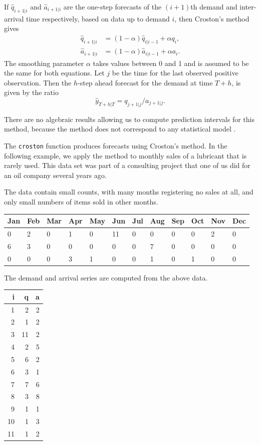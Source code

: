 \documentclass[]{book}
\begin{document}
If \(\hat{q}_{i+1|i}\) and \(\hat{a}_{i+1|i}\) are the one-step forecasts of the \((i+1)\)th demand and inter-arrival time respectively, based on data up to demand \(i\), then Croston's method gives
\begin{align}
\hat{q}_{i+1|i} & = (1-\alpha)\hat{q}_{i|i-1} + \alpha q_i, \label{eq:c2method1}\\
\hat{a}_{i+1|i} & = (1-\alpha)\hat{a}_{i|i-1} + \alpha a_i. \label{eq:c2method2}
\end{align}
The smoothing parameter \(\alpha\) takes values between 0 and 1 and is assumed to be the same for both equations. Let \(j\) be the time for the last observed positive observation. Then the \(h\)-step ahead forecast for the demand at time \(T+h\), is given by the ratio
\begin{equation}\label{c2ratio}
\hat{y}_{T+h|T} = q_{j+1|j}/a_{j+1|j}.
\end{equation}

There are no algebraic results allowing us to compute prediction intervals for this method, because the method does not correspond to any statistical model \citep{SH05}.

The \texttt{croston} function produces forecasts using Croston's method. In the following example, we apply the method to monthly sales of a lubricant that is rarely used. This data set was part of a consulting project that one of us did for an oil company several years ago.

The data contain small counts, with many months registering no sales at all, and only small numbers of items sold in other months.

\begin{tabular}{l|l|l|l|l|l|l|l|l|l|l|l}
\hline
Jan & Feb & Mar & Apr & May & Jun & Jul & Aug & Sep & Oct & Nov & Dec\\
\hline
0 & 2 & 0 & 1 & 0 & 11 & 0 & 0 & 0 & 0 & 2 & 0\\
\hline
6 & 3 & 0 & 0 & 0 & 0 & 0 & 7 & 0 & 0 & 0 & 0\\
\hline
0 & 0 & 0 & 3 & 1 & 0 & 0 & 1 & 0 & 1 & 0 & 0\\
\hline
\end{tabular}

The demand and arrival series are computed from the above data.

\begin{tabular}{r|r|r}
\hline
i & q & a\\
\hline
1 & 2 & 2\\
\hline
2 & 1 & 2\\
\hline
3 & 11 & 2\\
\hline
4 & 2 & 5\\
\hline
5 & 6 & 2\\
\hline
6 & 3 & 1\\
\hline
7 & 7 & 6\\
\hline
8 & 3 & 8\\
\hline
9 & 1 & 1\\
\hline
10 & 1 & 3\\
\hline
11 & 1 & 2\\
\hline
\end{tabular}
\end{document}
